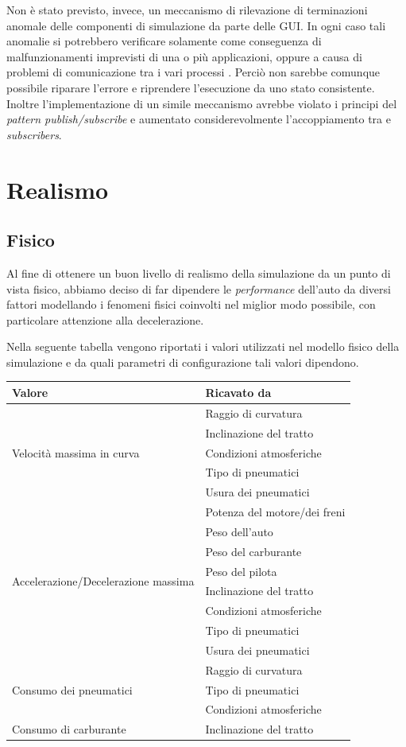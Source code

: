 Non è stato previsto, invece, un meccanismo di rilevazione di terminazioni anomale delle componenti di simulazione da parte delle GUI. In ogni caso tali anomalie si potrebbero verificare solamente come conseguenza di malfunzionamenti imprevisti di una o più applicazioni, oppure a causa di problemi di comunicazione tra i vari processi \Erlang{}. Perciò non sarebbe comunque possibile riparare l'errore e riprendere l'esecuzione da uno stato consistente. Inoltre l'implementazione di un simile meccanismo avrebbe violato i principi del \textit{pattern \mbox{publish/subscribe}} e aumentato considerevolmente l'accoppiamento tra \evdisp{} e \textit{subscribers}.

\section{Realismo}
\subsection*{Fisico}
Al fine di ottenere un buon livello di realismo della simulazione da un punto di vista fisico, abbiamo deciso di far dipendere le \textit{performance} dell'auto da diversi fattori modellando i fenomeni fisici coinvolti nel miglior modo possibile, con particolare attenzione alla decelerazione.

Nella seguente tabella vengono riportati i valori utilizzati nel modello fisico della simulazione e da quali parametri di configurazione tali valori dipendono.
\begin{center}
\begin{tabular}{|l|l|}
\hline
\textbf{Valore} & \textbf{Ricavato da} \\
\hline
\multirow{5}{*}{Velocità massima in curva} & Raggio di curvatura\\
& Inclinazione del tratto\\
& Condizioni atmosferiche\\
& Tipo di pneumatici\\
& Usura dei pneumatici\\
\hline
\multirow{8}{*}{Accelerazione/Decelerazione massima} & Potenza del motore/dei freni\\
& Peso dell'auto\\
& Peso del carburante\\
& Peso del pilota\\
& Inclinazione del tratto\\
& Condizioni atmosferiche\\
& Tipo di pneumatici\\
& Usura dei pneumatici\\
\hline
\multirow{3}{*}{Consumo dei pneumatici} & Raggio di curvatura\\
& Tipo di pneumatici\\
& Condizioni atmosferiche\\
\hline
Consumo di carburante & Inclinazione del tratto\\
\hline
\end{tabular}
\end{center}

